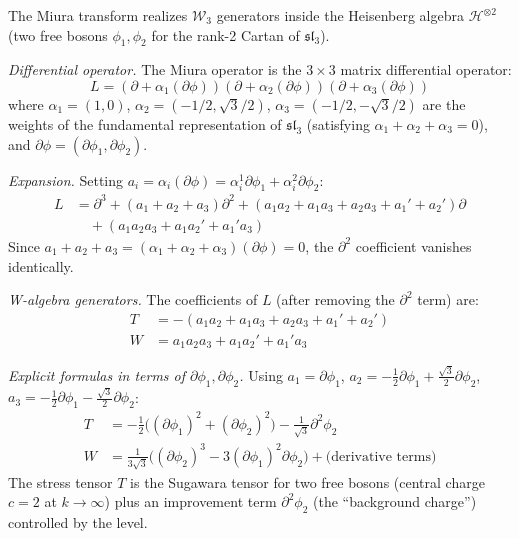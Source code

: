\begin{computation}
\label{comp:miura-w3}

The Miura transform realizes $\mathcal{W}_3$ generators inside the
Heisenberg algebra $\mathcal{H}^{\otimes 2}$ (two free bosons $\phi_1, \phi_2$
for the rank-2 Cartan of $\mathfrak{sl}_3$).

\emph{Differential operator.}
The Miura operator is the $3 \times 3$ matrix differential operator:
\begin{equation}\label{eq:miura-sl3}
L = (\partial + \alpha_1(\partial\phi))
(\partial + \alpha_2(\partial\phi))
(\partial + \alpha_3(\partial\phi))
\end{equation}
where $\alpha_1 = (1, 0)$, $\alpha_2 = (-1/2, \sqrt{3}/2)$,
$\alpha_3 = (-1/2, -\sqrt{3}/2)$ are the weights of the fundamental
representation of $\mathfrak{sl}_3$ (satisfying $\alpha_1+\alpha_2+\alpha_3=0$),
and $\partial\phi = (\partial\phi_1, \partial\phi_2)$.

\emph{Expansion.}
Setting $a_i = \alpha_i(\partial\phi) = \alpha_i^1 \partial\phi_1
+ \alpha_i^2 \partial\phi_2$:
\begin{align*}
L &= \partial^3 + (a_1+a_2+a_3)\partial^2
+ (a_1 a_2 + a_1 a_3 + a_2 a_3 + a_1' + a_2')\partial \\
&\quad + (a_1 a_2 a_3 + a_1 a_2' + a_1' a_3)
\end{align*}
Since $a_1 + a_2 + a_3 = (\alpha_1+\alpha_2+\alpha_3)(\partial\phi) = 0$,
the $\partial^2$ coefficient vanishes identically.

\emph{W-algebra generators.}
The coefficients of $L$ (after removing the $\partial^2$ term) are:
\begin{align}
T &= -(a_1 a_2 + a_1 a_3 + a_2 a_3 + a_1' + a_2')
\label{eq:miura-T} \\
W &= a_1 a_2 a_3 + a_1 a_2' + a_1' a_3
\label{eq:miura-W}
\end{align}

\emph{Explicit formulas in terms of $\partial\phi_1, \partial\phi_2$.}
Using $a_1 = \partial\phi_1$,
$a_2 = -\frac{1}{2}\partial\phi_1 + \frac{\sqrt{3}}{2}\partial\phi_2$,
$a_3 = -\frac{1}{2}\partial\phi_1 - \frac{\sqrt{3}}{2}\partial\phi_2$:
\begin{align}
T &= -\frac{1}{2}\bigl((\partial\phi_1)^2 + (\partial\phi_2)^2\bigr)
- \frac{1}{\sqrt{3}}\partial^2\phi_2
\label{eq:miura-T-explicit} \\
W &= \frac{1}{3\sqrt{3}}\bigl((\partial\phi_2)^3
- 3(\partial\phi_1)^2 \partial\phi_2\bigr)
+ \text{(derivative terms)}
\label{eq:miura-W-explicit}
\end{align}
The stress tensor $T$ is the Sugawara tensor for two free bosons
(central charge $c = 2$ at $k \to \infty$) plus an improvement term
$\partial^2\phi_2$ (the ``background charge'') controlled by the level.


\end{computation}
